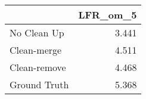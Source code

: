 \begin{tabular}{lr}
\toprule
{} & LFR_om_5 \\
\midrule
No Clean Up  &    3.441 \\
Clean-merge  &    4.511 \\
Clean-remove &    4.468 \\
Ground Truth &    5.368 \\
\bottomrule
\end{tabular}
